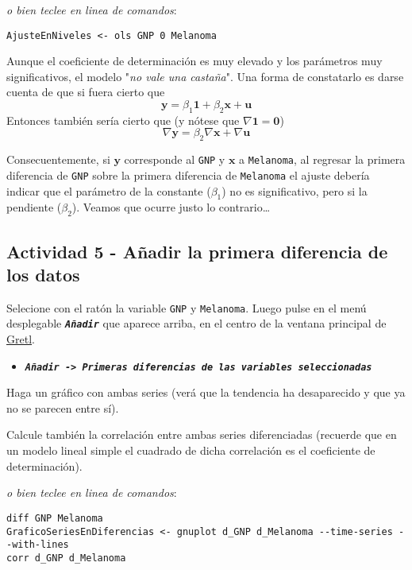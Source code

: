 \documentclass[11pt]{article}
\begin{document}
{\vspace{0pt} \footnotesize \color{gray!70!black}
\emph{o bien teclee en linea de comandos}:
\begin{verbatim}
AjusteEnNiveles <- ols GNP 0 Melanoma
\end{verbatim}
}

Aunque el coeficiente de determinación es muy elevado y los parámetros
muy significativos, el modelo "\emph{no vale una castaña}". Una forma de
constatarlo es darse cuenta de que si fuera cierto que $$
\boldsymbol{y}=\beta_1 \boldsymbol{1} + \beta_2 \boldsymbol{x} +
\boldsymbol{u} $$ Entonces también sería cierto que (y nótese que
\(\nabla\boldsymbol{1}=\boldsymbol{0}\)) $$ \nabla\boldsymbol{y}=
\beta_2 \nabla\boldsymbol{x} + \nabla\boldsymbol{u}$$

Consecuentemente, si \(\boldsymbol{y}\) corresponde al \texttt{GNP} y
\(\boldsymbol{x}\) a \texttt{Melanoma}, al regresar la primera diferencia de
\texttt{GNP} sobre la primera diferencia de \texttt{Melanoma} el ajuste debería
indicar que el parámetro de la constante (\(\beta_1\)) no es
significativo, pero si la pendiente (\(\beta_2\)). Veamos que ocurre justo lo contrario\ldots{}

\subsection{Actividad 5 - Añadir la primera diferencia de los datos}
\label{sec:org9501b93}

Selecione con el ratón la variable \texttt{GNP} y \texttt{Melanoma}. Luego pulse en el menú desplegable \textbf{\emph{\texttt{Añadir}}} que aparece arriba, en el centro de la
ventana principal de \href{https://gretl.sourceforge.net/es.html}{Gretl}.
\begin{itemize}
\item \textbf{\emph{\texttt{Añadir -> Primeras diferencias de las variables seleccionadas}}}
\end{itemize}

Haga un gráfico con ambas series (verá que la tendencia ha desaparecido y que ya no se parecen entre sí).

Calcule también la correlación entre ambas series diferenciadas
(recuerde que en un modelo lineal simple el cuadrado de dicha
correlación es el coeficiente de determinación).

{\vspace{0pt} \footnotesize \color{gray!70!black}
\emph{o bien teclee en linea de comandos}: 
\begin{verbatim}
diff GNP Melanoma
GraficoSeriesEnDiferencias <- gnuplot d_GNP d_Melanoma --time-series --with-lines
corr d_GNP d_Melanoma
\end{verbatim}
}
\end{document}
